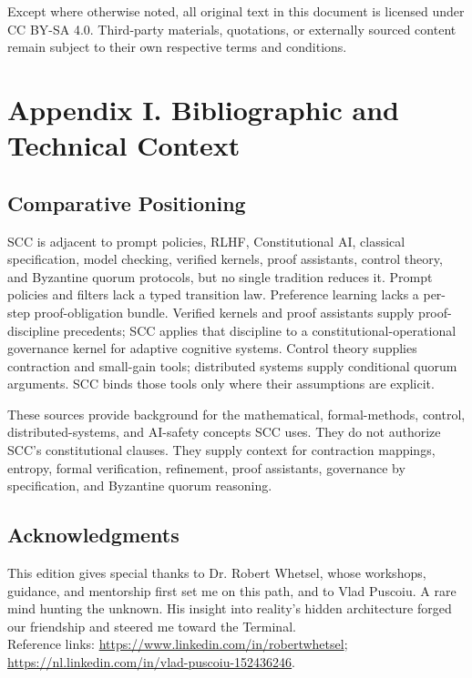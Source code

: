 \documentclass[10pt,oneside]{article}
\theoremstyle{definition}
\theoremstyle{remark}
\begin{document}
Except where otherwise noted, all original text in this document is licensed under CC BY-SA 4.0. Third-party materials, quotations, or externally sourced content remain subject to their own respective terms and conditions.

\section{Appendix I. Bibliographic and Technical Context}
\subsection*{Comparative Positioning}
SCC is adjacent to prompt policies, RLHF, Constitutional AI, classical specification, model checking, verified kernels, proof assistants, control theory, and Byzantine quorum protocols, but no single tradition reduces it. Prompt policies and filters lack a typed transition law. Preference learning lacks a per-step proof-obligation bundle. Verified kernels and proof assistants supply proof-discipline precedents; SCC applies that discipline to a constitutional-operational governance kernel for adaptive cognitive systems. Control theory supplies contraction and small-gain tools; distributed systems supply conditional quorum arguments. SCC binds those tools only where their assumptions are explicit.

These sources provide background for the mathematical, formal-methods, control, distributed-systems, and AI-safety concepts SCC uses. They do not authorize SCC's constitutional clauses. They supply context for contraction mappings, entropy, formal verification, refinement, proof assistants, governance by specification, and Byzantine quorum reasoning.

\subsection*{Acknowledgments}
This edition gives special thanks to Dr. Robert Whetsel, whose workshops, guidance, and mentorship first set me on this path, and to Vlad Puscoiu. A rare mind hunting the unknown. His insight into reality’s hidden architecture forged our friendship and steered me toward the Terminal.\\
{\footnotesize Reference links: \url{https://www.linkedin.com/in/robertwhetsel}; \url{https://nl.linkedin.com/in/vlad-puscoiu-152436246}.}
\end{document}

